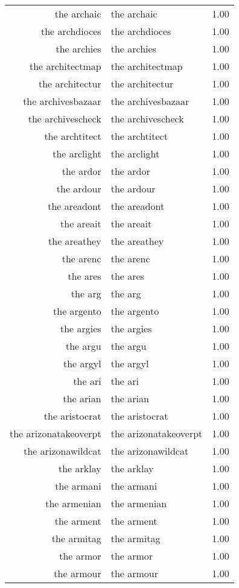 \begin{table}[ht]
\begin{tabular}{rlr}
  the archaic & the archaic & 1.00 \\ 
  the archdioces & the archdioces & 1.00 \\ 
  the archies & the archies & 1.00 \\ 
  the architectmap & the architectmap & 1.00 \\ 
  the architectur & the architectur & 1.00 \\ 
  the archivesbazaar & the archivesbazaar & 1.00 \\ 
  the archivescheck & the archivescheck & 1.00 \\ 
  the archtitect & the archtitect & 1.00 \\ 
  the arclight & the arclight & 1.00 \\ 
  the ardor & the ardor & 1.00 \\ 
  the ardour & the ardour & 1.00 \\ 
  the areadont & the areadont & 1.00 \\ 
  the areait & the areait & 1.00 \\ 
  the areathey & the areathey & 1.00 \\ 
  the arenc & the arenc & 1.00 \\ 
  the ares & the ares & 1.00 \\ 
  the arg & the arg & 1.00 \\ 
  the argento & the argento & 1.00 \\ 
  the argies & the argies & 1.00 \\ 
  the argu & the argu & 1.00 \\ 
  the argyl & the argyl & 1.00 \\ 
  the ari & the ari & 1.00 \\ 
  the arian & the arian & 1.00 \\ 
  the aristocrat & the aristocrat & 1.00 \\ 
  the arizonatakeoverpt & the arizonatakeoverpt & 1.00 \\ 
  the arizonawildcat & the arizonawildcat & 1.00 \\ 
  the arklay & the arklay & 1.00 \\ 
  the armani & the armani & 1.00 \\ 
  the armenian & the armenian & 1.00 \\ 
  the arment & the arment & 1.00 \\ 
  the armitag & the armitag & 1.00 \\ 
  the armor & the armor & 1.00 \\ 
  the armour & the armour & 1.00 \\ 

\end{tabular}
\end{table}
